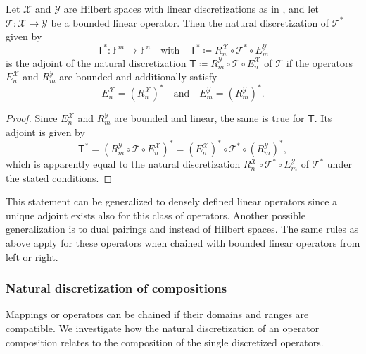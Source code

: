 \documentclass[a4paper]{paper}
\newcommand*{\SPC}[1]{{\ensuremath{\mathscr{#1}}}}
\newcommand*{\SPCX}{\SPC{X}}
\newcommand*{\SPCY}{\SPC{Y}}
\newcommand{\FIELD}{{\ensuremath{\mathbb{F}}}}
\newcommand*{\Fn}{{\ensuremath{\FIELD^n}}}
\newcommand*{\Fm}{{\ensuremath{\FIELD^m}}}
\newcommand*{\OP}[1]{{\ensuremath{\mathcal{#1}}}}
\newcommand*{\OPT}{\OP{T}}
\newcommand{\DISCOP}[1]{{\ensuremath{\mathsf{#1}}}}
\newcommand*{\DISCOPT}{\DISCOP{T}}
\newcommand*{\EXT}[2]{\ensuremath{E_{#1}^{#2}}}
\newcommand*{\REST}[2]{\ensuremath{R_{#1}^{#2}}}
\newcommand*{\RnX}{{\ensuremath{\REST{n}{\SPC{X}}}}}
\newcommand*{\RmY}{{\ensuremath{\REST{m}{\SPC{Y}}}}}
\newcommand*{\EnX}{{\ensuremath{\EXT{n}{\SPC{X}}}}}
\newcommand*{\EmY}{{\ensuremath{\EXT{m}{\SPC{Y}}}}}
\DeclareMathOperator{\DEFEQ}{{\coloneqq}}
\begin{document}
\begin{lemma}
 \label{lemma:discr:operator:op_adj:natural_is_adj}
 Let $\SPCX$ and $\SPCY$ are Hilbert spaces with linear discretizations as in 
 , and let $\OPT \colon \SPCX \to \SPCY$ be a bounded linear operator. 
 Then the natural discretization of $\OPT^*$ given by
 \begin{equation*}
  \DISCOPT^* \colon \Fm \to \Fn
  \quad \text{with} \quad
  \DISCOPT^* \DEFEQ  \RnX \circ \OPT^* \circ \EmY
 \end{equation*}
 is the adjoint of the natural discretization $\DISCOPT \DEFEQ  \RmY \circ \OPT \circ \EnX$ of $\OPT$ if the 
operators 
 $\EnX$ and $\RmY$ are bounded and additionally satisfy
 \begin{equation*}
  \EnX = (\RnX)^* \quad \text{and} \quad \EmY = (\RmY)^*.
 \end{equation*}
\end{lemma}
\vspace{1em}


\begin{proof}
 Since $\EnX$ and $\RmY$ are bounded and linear, the same is true for $\DISCOPT$. Its adjoint is given by
 \begin{equation*}
  \DISCOPT^* = (\RmY \circ \OPT \circ \EnX)^* = (\EnX)^* \circ \OPT^* \circ (\RmY)^*,
 \end{equation*}
 which is apparently equal to the natural discretization $\RnX \circ \OPT^* \circ \EmY$ of $\OPT^*$ under the 
 stated conditions.
\end{proof}

\begin{remark}
 This statement can be generalized to densely defined linear operators since a unique adjoint exists also for this 
 class of operators. Another possible generalization is to dual pairings and instead of Hilbert spaces. The same rules 
 as above apply for these operators when chained with bounded linear operators from left or right.
\end{remark}


\subsubsection{Natural discretization of compositions}
\label{subsubsec:discr:operator:op_comp}

Mappings or operators can be chained if their domains and ranges are compatible. We investigate how the natural 
discretization of an operator composition relates to the composition of the single discretized operators.
\end{document}
